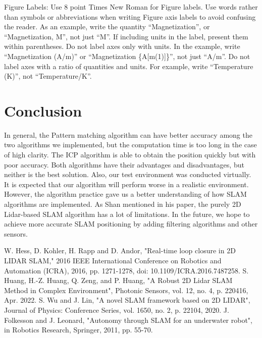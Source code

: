 \documentclass[conference]{IEEEtran}
\begin{document}
Figure Labels: Use 8 point Times New Roman for Figure labels. Use words 
rather than symbols or abbreviations when writing Figure axis labels to 
avoid confusing the reader. As an example, write the quantity 
``Magnetization'', or ``Magnetization, M'', not just ``M''. If including 
units in the label, present them within parentheses. Do not label axes only 
with units. In the example, write ``Magnetization (A/m)'' or ``Magnetization 
\{A[m(1)]\}'', not just ``A/m''. Do not label axes with a ratio of 
quantities and units. For example, write ``Temperature (K)'', not 
``Temperature/K''.

\section{Conclusion}
In general, the Pattern matching algorithm can have better accuracy among the two algorithms we implemented, but the computation time is too long in the case of high clarity. The ICP algorithm is able to obtain the position quickly but with poor accuracy. Both algorithms have their advantages and disadvantages, but neither is the best solution. Also, our test environment was conducted virtually. It is expected that our algorithm will perform worse in a realistic environment. However, the algorithm practice gave us a better understanding of how SLAM algorithms are implemented. As Shan mentioned in his paper, the purely 2D Lidar-based SLAM algorithm has a lot of limitations\cite{b2}. In the future, we hope to achieve more accurate SLAM positioning by adding filtering algorithms and other sensors.

\begin{thebibliography}{00}
 W. Hess, D. Kohler, H. Rapp and D. Andor, "Real-time loop closure in 2D LIDAR SLAM," 2016 IEEE International Conference on Robotics and Automation (ICRA), 2016, pp. 1271-1278, doi: 10.1109/ICRA.2016.7487258.
 S. Huang, H.-Z. Huang, Q. Zeng, and P. Huang, "A Robust 2D Lidar SLAM Method in Complex Environment", Photonic Sensors, vol. 12, no. 4, p. 220416, Apr. 2022.
 S. Wu and J. Lin, "A novel SLAM framework based on 2D LIDAR", Journal of Physics: Conference Series, vol. 1650, no. 2, p. 22104, 2020.
 J. Folkesson and J. Leonard, "Autonomy through SLAM for an underwater robot", in Robotics Research, Springer, 2011, pp. 55-70.
\end{thebibliography}
\vspace{12pt}
\end{document}
